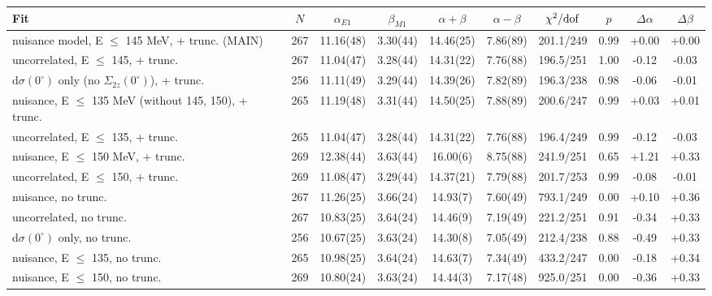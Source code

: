 \begin{tabular}{lccccccccc}
\hline
Fit & $N$ & $\alpha_{E1}$ & $\beta_{M1}$ & $\alpha+\beta$ & $\alpha-\beta$ & $\chi^2/{\rm dof}$ & $p$ & $\Delta\alpha$ & $\Delta\beta$ \\
\hline
nuisance model, E $\le$ 145 MeV, + trunc. (MAIN) & 267 & 11.16(48) & 3.30(44) & 14.46(25) & 7.86(89) & 201.1/249 & 0.99 & +0.00 & +0.00 \\
uncorrelated, E $\le$ 145, + trunc. & 267 & 11.04(47) & 3.28(44) & 14.31(22) & 7.76(88) & 196.5/251 & 1.00 & -0.12 & -0.03 \\
d$\sigma(0^\circ)$ only (no $\Sigma_{2z}(0^\circ)$), + trunc. & 256 & 11.11(49) & 3.29(44) & 14.39(26) & 7.82(89) & 196.3/238 & 0.98 & -0.06 & -0.01 \\
nuisance, E $\le$ 135 MeV (without 145, 150), + trunc. & 265 & 11.19(48) & 3.31(44) & 14.50(25) & 7.88(89) & 200.6/247 & 0.99 & +0.03 & +0.01 \\
uncorrelated, E $\le$ 135, + trunc. & 265 & 11.04(47) & 3.28(44) & 14.31(22) & 7.76(88) & 196.4/249 & 0.99 & -0.12 & -0.03 \\
nuisance, E $\le$ 150 MeV, + trunc. & 269 & 12.38(44) & 3.63(44) & 16.00(6) & 8.75(88) & 241.9/251 & 0.65 & +1.21 & +0.33 \\
uncorrelated, E $\le$ 150, + trunc. & 269 & 11.08(47) & 3.29(44) & 14.37(21) & 7.79(88) & 201.7/253 & 0.99 & -0.08 & -0.01 \\
nuisance, no trunc. & 267 & 11.26(25) & 3.66(24) & 14.93(7) & 7.60(49) & 793.1/249 & 0.00 & +0.10 & +0.36 \\
uncorrelated, no trunc. & 267 & 10.83(25) & 3.64(24) & 14.46(9) & 7.19(49) & 221.2/251 & 0.91 & -0.34 & +0.33 \\
d$\sigma(0^\circ)$ only, no trunc. & 256 & 10.67(25) & 3.63(24) & 14.30(8) & 7.05(49) & 212.4/238 & 0.88 & -0.49 & +0.33 \\
nuisance, E $\le$ 135, no trunc. & 265 & 10.98(25) & 3.64(24) & 14.63(7) & 7.34(49) & 433.2/247 & 0.00 & -0.18 & +0.34 \\
nuisance, E $\le$ 150, no trunc. & 269 & 10.80(24) & 3.63(24) & 14.44(3) & 7.17(48) & 925.0/251 & 0.00 & -0.36 & +0.33 \\
\hline
\end{tabular}

